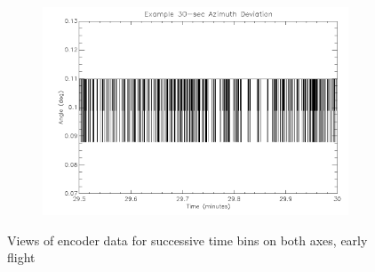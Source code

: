 {\begin{figure}[htbp]
\begin{subfigure}{0.45\textwidth}
		\caption{}
		\label{fig:sub:earlyalt30}
	\end{subfigure}
	\begin{subfigure}{0.45\textwidth}
		\includegraphics[width=1\linewidth]{appendix/img/campaign_results/earlyaz30sec.png}
		\caption{}
		\label{fig:sub:earlyaz30}
	\end{subfigure}
	\caption{Views of encoder data for successive time bins on both axes, early flight}
	\label{fig:earlyflight}
\end{figure}

}
